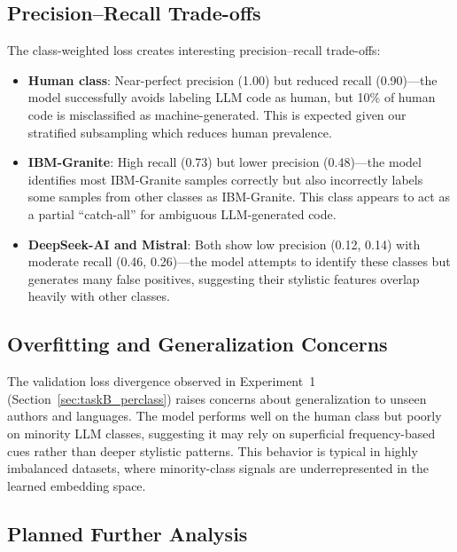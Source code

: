 \documentclass[11pt]{article}
\begin{document}
\subsection{Precision--Recall Trade-offs}

The class-weighted loss creates interesting precision--recall trade-offs:
\begin{itemize}
    \item \textbf{Human class}: Near-perfect precision (1.00) but reduced recall (0.90)---the model successfully avoids labeling LLM code as human, but 10\% of human code is misclassified as machine-generated. This is expected given our stratified subsampling which reduces human prevalence.
    \item \textbf{IBM-Granite}: High recall (0.73) but lower precision (0.48)---the model identifies most IBM-Granite samples correctly but also incorrectly labels some samples from other classes as IBM-Granite. This class appears to act as a partial ``catch-all'' for ambiguous LLM-generated code.
    \item \textbf{DeepSeek-AI and Mistral}: Both show low precision (0.12, 0.14) with moderate recall (0.46, 0.26)---the model attempts to identify these classes but generates many false positives, suggesting their stylistic features overlap heavily with other classes.
\end{itemize}

\subsection{Overfitting and Generalization Concerns}

The validation loss divergence observed in Experiment~1 (Section~\ref{sec:taskB_perclass}) raises concerns about generalization to unseen authors and languages. The model performs well on the human class but poorly on minority LLM classes, suggesting it may rely on superficial frequency-based cues rather than deeper stylistic patterns. This behavior is typical in highly imbalanced datasets, where minority-class signals are underrepresented in the learned embedding space.

\subsection{Planned Further Analysis}
\end{document}
